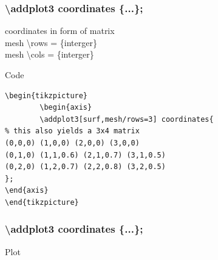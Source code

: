 \documentclass{beamer}
\begin{document}
\begin{frame}[fragile]
   \frametitle{\color{blue}\textbackslash addplot3 coordinates \color{black} \{...\};}
   coordinates in form of matrix\\
   \color{blue} mesh \textbackslash rows \color{black}= \{interger\}\\
   \color{blue} mesh \textbackslash cols \color{black}= \{interger\}\\
\begin{block}{Code}
\begin{verbatim}
\begin{tikzpicture}
		\begin{axis}
		\addplot3[surf,mesh/rows=3] coordinates{
% this also yields a 3x4 matrix
(0,0,0) (1,0,0) (2,0,0) (3,0,0)
(0,1,0) (1,1,0.6) (2,1,0.7) (3,1,0.5)
(0,2,0) (1,2,0.7) (2,2,0.8) (3,2,0.5)
};
\end{axis}
\end{tikzpicture}
\end{verbatim}
\end{block}
\end{frame}   
\begin{frame}[fragile]
   \frametitle{\color{blue}\textbackslash addplot3 coordinates \color{black} \{...\};}
\begin{block}{Plot}
\end{block}
\end{frame}
\end{document}

